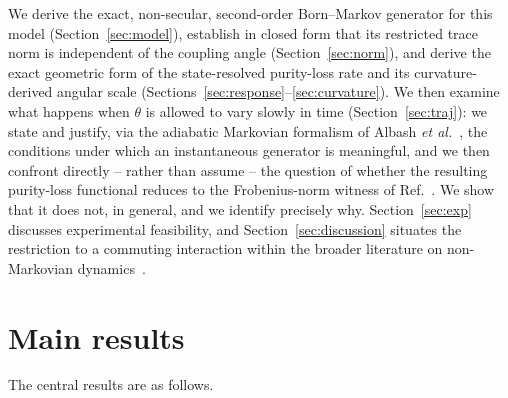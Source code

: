 \documentclass[aps,pra,reprint,superscriptaddress,nofootinbib,longbibliography]{revtex4-2}
\begin{document}
We derive the exact, non-secular, second-order Born--Markov generator
for this model (Section~\ref{sec:model}), establish in closed form
that its restricted trace norm is independent of the coupling angle
(Section~\ref{sec:norm}), and derive the exact geometric form of the
state-resolved purity-loss rate and its curvature-derived angular
scale (Sections~\ref{sec:response}--\ref{sec:curvature}). We then
examine what happens when $\theta$ is allowed to vary slowly in time
(Section~\ref{sec:traj}): we state and justify, via the adiabatic
Markovian formalism of Albash \emph{et
al.}~\cite{albash2012adiabatic}, the conditions under which an
instantaneous generator is meaningful, and we then confront directly
-- rather than assume -- the question of whether the resulting
purity-loss functional reduces to the Frobenius-norm witness of
Ref.~\cite{rodrigues2025}. We show that it does not, in general, and
we identify precisely why. Section~\ref{sec:exp} discusses
experimental feasibility, and Section~\ref{sec:discussion} situates
the restriction to a commuting interaction within the broader
literature on non-Markovian
dynamics~\cite{rivas2014quantum,devega2017dynamics,breuer2009measure,zurek2003decoherence,gardiner2004quantum}.

\section{Main results}
\label{sec:results}

The central results are as follows.
\end{document}
